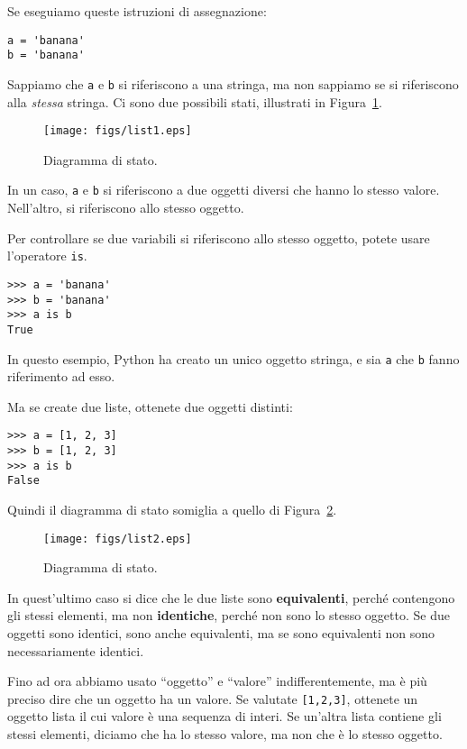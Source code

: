 \documentclass[10pt]{book}
\begin{document}
Se eseguiamo queste istruzioni di assegnazione:

\begin{verbatim}
a = 'banana'
b = 'banana'
\end{verbatim}
%
Sappiamo che {\tt a} e {\tt b} si riferiscono a una stringa, ma non sappiamo se si riferiscono alla {\em stessa} stringa.
Ci sono due possibili stati, illustrati in Figura~\ref{fig.list1}.

\begin{figure}
\centerline
{\texttt{[image: figs/list1.eps]}}
\caption{Diagramma di stato.}
\label{fig.list1}
\end{figure}


In un caso, {\tt a} e {\tt b} si riferiscono a due oggetti diversi che hanno lo stesso valore. Nell'altro, si riferiscono allo stesso oggetto.

Per controllare se due variabili si riferiscono allo stesso oggetto, potete usare l'operatore {\tt is}.

\begin{verbatim}
>>> a = 'banana'
>>> b = 'banana'
>>> a is b
True
\end{verbatim}
%
In questo esempio, Python ha creato un unico oggetto stringa, e sia {\tt a} che {\tt b} fanno riferimento ad esso.

Ma se create due liste, ottenete due oggetti distinti:

\begin{verbatim}
>>> a = [1, 2, 3]
>>> b = [1, 2, 3]
>>> a is b
False
\end{verbatim}
%
Quindi il diagramma di stato somiglia a quello di Figura~\ref{fig.list2}.

\begin{figure}
\centerline
{\texttt{[image: figs/list2.eps]}}
\caption{Diagramma di stato.}
\label{fig.list2}
\end{figure}

In quest'ultimo caso si dice che le due liste sono {\bf equivalenti},
perché contengono gli stessi elementi, ma non {\bf identiche}, perché non sono lo stesso oggetto.
Se due oggetti sono identici, sono anche equivalenti, ma se sono equivalenti non sono necessariamente identici.

Fino ad ora abbiamo usato ``oggetto'' e ``valore'' indifferentemente, ma è più preciso dire che un oggetto ha un valore.  Se valutate {\tt [1,2,3]}, ottenete un oggetto lista il cui valore è una sequenza di interi. Se un'altra lista contiene gli stessi elementi, diciamo che ha lo stesso valore, ma non che è lo stesso oggetto.
\end{document}
